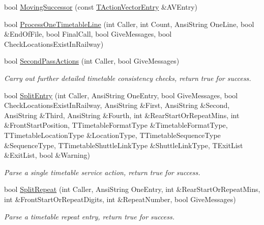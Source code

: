 \begin{DoxyCompactItemize}
bool \mbox{\hyperlink{class_t_train_controller_ae6c929171fa673b87e68694e6f48985d}{Moving\+Successor}} (const \mbox{\hyperlink{class_t_action_vector_entry}{T\+Action\+Vector\+Entry}} \&A\+V\+Entry)
\item 
bool \mbox{\hyperlink{class_t_train_controller_a5c51eb1e0018e189966ffdbc5d251990}{Process\+One\+Timetable\+Line}} (int Caller, int Count, Ansi\+String One\+Line, bool \&End\+Of\+File, bool Final\+Call, bool Give\+Messages, bool Check\+Locations\+Exist\+In\+Railway)
\item 
\mbox{\label{class_t_train_controller_a193bc964187b0ae255251d2c7136540a}} 
bool \mbox{\hyperlink{class_t_train_controller_a193bc964187b0ae255251d2c7136540a}{Second\+Pass\+Actions}} (int Caller, bool Give\+Messages)
\begin{DoxyCompactList}\small\item\em Carry out further detailed timetable consistency checks, return true for success. \end{DoxyCompactList}\item 
\mbox{\label{class_t_train_controller_a9067975adc343b753d7eb882648c66bb}} 
bool \mbox{\hyperlink{class_t_train_controller_a9067975adc343b753d7eb882648c66bb}{Split\+Entry}} (int Caller, Ansi\+String One\+Entry, bool Give\+Messages, bool Check\+Locations\+Exist\+In\+Railway, Ansi\+String \&First, Ansi\+String \&Second, Ansi\+String \&Third, Ansi\+String \&Fourth, int \&Rear\+Start\+Or\+Repeat\+Mins, int \&Front\+Start\+Position, T\+Timetable\+Format\+Type \&Timetable\+Format\+Type, T\+Timetable\+Location\+Type \&Location\+Type, T\+Timetable\+Sequence\+Type \&Sequence\+Type, T\+Timetable\+Shuttle\+Link\+Type \&Shuttle\+Link\+Type, T\+Exit\+List \&Exit\+List, bool \&Warning)
\begin{DoxyCompactList}\small\item\em Parse a single timetable service action, return true for success. \end{DoxyCompactList}\item 
\mbox{\label{class_t_train_controller_a03d63b7579e50c092cca3b5200d9dafb}} 
bool \mbox{\hyperlink{class_t_train_controller_a03d63b7579e50c092cca3b5200d9dafb}{Split\+Repeat}} (int Caller, Ansi\+String One\+Entry, int \&Rear\+Start\+Or\+Repeat\+Mins, int \&Front\+Start\+Or\+Repeat\+Digits, int \&Repeat\+Number, bool Give\+Messages)
\begin{DoxyCompactList}\small\item\em Parse a timetable repeat entry, return true for success. \end{DoxyCompactList}\item 

\end{DoxyCompactItemize}
